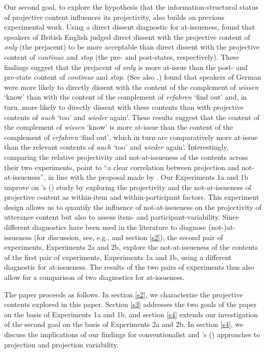 \documentclass[11pt,fleqn]{article}
\newcommand{\6}{\mbox{$[\hspace*{-.6mm}[$}}
\newcommand{\9}{\mbox{$]\hspace*{-.6mm}]$}}
\newcommand{\citetpos}[1]{\citeauthor{#1}'s (\citeyear{#1})}
\begin{document}
Our second goal, to explore the hypothesis that the information-structural status of projective content influences its projectivity, also builds on previous experimental work. 
 Using a direct dissent diagnostic for at-issueness, \citet{amaral-etal11} found that speakers of British English judged direct dissent with the projective content of {\em only} (the prejacent) to be more acceptable than direct dissent with the projective content of {\em continue} and {\em stop} (the pre- and post-states, respectively). These findings suggest that the prejacent of {\em only} is more at-issue than the post- and pre-state content of {\em continue} and {\em stop}. (See also \citealt{cummins-etal2012}.) \citet{xue-onea11} found that speakers of German were more likely to directly dissent with the content of the complement of {\em wissen} `know' than with the content of the complement of {\em erfahren} `find out' and, in turn, more likely to directly dissent with these contents than with projective contents of {\em auch} `too' and {\em wieder} again'. These results suggest that the content of the complement of {\em wissen} `know' is more at-issue than the content of the complement of {\em erfahren} `find out', which in turn are comparatively more at-issue than the relevant contents of {\em auch} `too' and {\em wieder} again'. Interestingly, comparing the relative projectivity and not-at-issueness 
of the contents across their two experiments, \citet[180]{xue-onea11} point to ``a clear correlation between projection and not-at-issueness'', in line with the proposal made by \citealt{brst-salt10}. Our Experiments 1a and 1b improve on \citetpos{xue-onea11} study by exploring the projectivity and the not-at-issueness of projective content as within-item and within-participant factors. This experiment design allows us to quantify the influence of not-at-issueness on the projectivity of utterance content but also to assess item- and participant-variability. Since different diagnostics have been used in the literature to diagnose (not-)at-issueness (for discussion, see, e.g., \citealt{tonhauser-sula6} and section \ref{s2}), the second pair of experiments, Experiments 2a and 2b, explore the not-at-issueness of the contents of the first pair of experiments, Experiments 1a and 1b, using a different diagnostic for at-issueness. The results of the two pairs of experiments thus also allow for a comparison of two diagnostics for at-issueness.

The paper proceeds as follows. In section \ref{s2}, we characterize the projective contents explored in this paper. Section \ref{s3} addresses the two goals of the paper on the basis of Experiments 1a and 1b, and section \ref{s4} extends our investigation of the second goal on the basis of Experiments 2a and 2b. In section \ref{s4}, we discuss the implications of our findings for conventionalist and \citetpos{brst-salt10} approaches to projection and projection variability.
\end{document}
